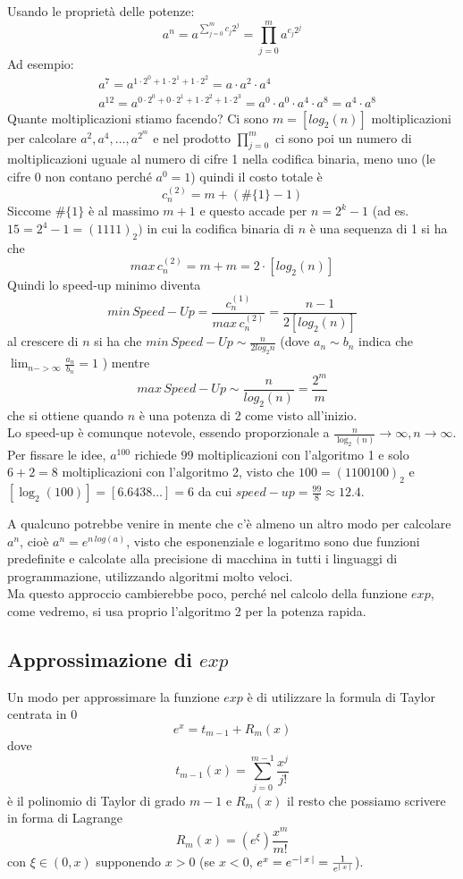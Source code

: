 \bigskip
Usando le proprietà delle potenze:
\[ a^n=a^{\sum_{j=0}^{m} c_j 2^j}=\prod_{j=0}^{m} a^{c_j 2^j} \]
Ad esempio:
\[\begin{split}
	& a^7=a^{1\cdot 2^0 + 1\cdot 2^1 + 1\cdot 2^2}=a\cdot a^2\cdot a^4 \\
	& a^{12}=a^{0\cdot 2^0+0\cdot 2^1+1\cdot 2^2+1\cdot 2^3} = a^0\cdot a^0\cdot a^4\cdot a^8 =a^4\cdot a^8 
\end{split}\]
Quante moltiplicazioni stiamo facendo? Ci sono $m=[log_{2}(n)]$ moltiplicazioni per calcolare $a^2 , a^4 , \dotsc , a^{2^m}$ e nel prodotto $\prod_{j=0}^m$ ci sono poi un numero di moltiplicazioni uguale al numero di cifre 1 nella codifica binaria, meno uno (le cifre 0 non contano perché $a^0=1$) quindi il costo totale è \[c_n^{(2)}=m+(\#\{1\}-1)\]
Siccome $\#\{1\}$ è al massimo $m+1$ e questo accade per $n=2^k-1$ (ad es. $15=2^4-1=(1111)_2)$ in cui la codifica binaria di $n$ è una sequenza di 1 si ha che
\[max\,c_n^{(2)} = m+m = 2\cdot [log_2(n)]\]
Quindi lo speed-up minimo diventa
\[min\,Speed-Up=\frac{c^{(1)}_n}{max\,c^{(2)}_n} = \frac{n-1}{2[log_2(n)]}\]
al crescere di $n$ si ha che $min\,Speed-Up \sim \frac{n}{2log_{2}n}$ (dove $a_n \sim b_n$ indica che $\lim_{n->\infty} \frac{a_n}{b_n}=1$ ) mentre 
\[max\,Speed-Up \sim \frac{n}{log_{2}(n)} = \frac{2^m}{m}\]
che si ottiene quando $n$ è una potenza di 2 come visto all'inizio. \\
Lo speed-up è comunque notevole, essendo proporzionale a $\frac{n}{\log_2(n)} \to \infty, n\to \infty$. \\
Per fissare le idee, $a^{100}$ richiede $99$ moltiplicazioni con l'algoritmo 1 e solo $6+2=8$ moltiplicazioni con l'algoritmo 2, visto che $100=(1100100)_2$ e $[\log_2(100)]=[6.6438\dotsc]=6$ da cui $speed-up=\frac{99}{8}\approx 12.4$.

\bigskip
A qualcuno potrebbe venire in mente che c'è almeno un altro modo per calcolare $a^n$, cioè $a^n=e^{n\,log(a)}$, visto che esponenziale e logaritmo sono due funzioni predefinite e calcolate alla precisione di macchina in tutti i linguaggi di programmazione, utilizzando algoritmi molto veloci. \\
Ma questo approccio cambierebbe poco, perché nel calcolo della funzione $exp$, come vedremo, si usa proprio l'algoritmo 2 per la potenza rapida.

\subsection{Approssimazione di $exp$}
Un modo per approssimare la funzione $exp$ è di utilizzare la formula di Taylor centrata in 0
\[e^x=t_{m-1}+R_m(x)\]
dove 
\[t_{m-1}(x)=\sum_{j=0}^{m-1}\frac{x^j}{j!}\]
è il polinomio di Taylor di grado $m-1$ e $R_m(x)$ il resto che possiamo scrivere in forma di Lagrange
\[R_m(x)=(e^{\xi})\frac{x^m}{m!}\]
con $\xi\in(0,x) $ supponendo $x>0$ (se $x<0$, $e^x=e^{-\lvert\,x\,\rvert}=\frac{1}{e^{\lvert\,x\,\rvert}}$).\\

